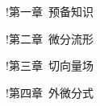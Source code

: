 \begin{structure}
    \subpage!{第一章\ 预备知识}

    \subpage!{第二章\ 微分流形}

    \subpage!{第三章\ 切向量场}

    \subpage!{第四章\ 外微分式}    
\end{structure}